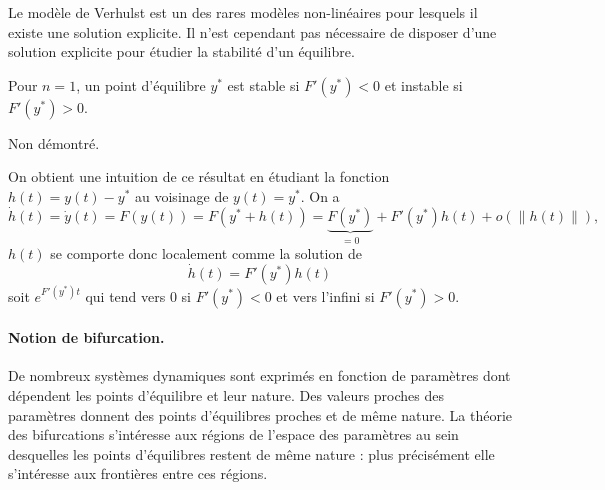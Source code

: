 \remark
Le modèle de Verhulst est un des rares modèles non-linéaires pour lesquels il existe une solution explicite. Il n'est cependant pas nécessaire de disposer d'une solution explicite pour étudier la stabilité d'un équilibre.

\begin{theorem}[Stabilité ($n = 1$)]
  Pour $n=1$, un point d'équilibre $y^*$ est stable si $F'(y^*) < 0$ et instable si $F'(y^*) > 0$.
\end{theorem}

\proof Non démontré. \eproof

\remark
On obtient une intuition de ce résultat en étudiant la fonction $h(t) = y(t) - y^*$ au voisinage de $y(t) = y^*$. On a
$$
\dot h(t) = \dot y(t) = F(y(t)) = F(y^* + h(t)) = \underset{=0}{\underbrace{F(y^*)}} + F'(y^*) h(t) + o(\|h(t)\|),
$$
$h(t)$ se comporte donc localement comme la solution de 
$$
\dot h(t) = F'(y^*) h(t)
$$
soit $e ^{F'(y^*) t}$ qui tend vers 0 si $F'(y^*) < 0$ et vers l'infini si $F'(y^*) > 0$.


\paragraph*{Notion de bifurcation.}
De nombreux systèmes dynamiques sont exprimés en fonction de paramètres dont dépendent les points d'équilibre et leur nature. Des valeurs proches des paramètres donnent des points d'équilibres proches et de même nature. La théorie des bifurcations s'intéresse aux régions de l'espace des paramètres au sein desquelles les points d'équilibres restent de même nature : plus précisément elle s'intéresse aux frontières entre ces régions.

